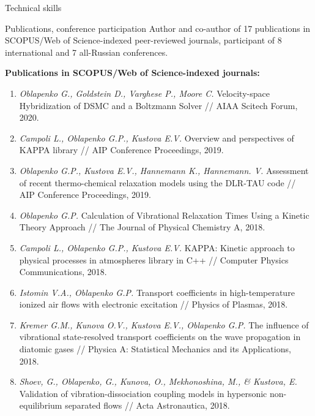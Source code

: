\documentclass{resume} %
\begin{document}
\begin{rSection}{Technical skills}
\pagebreak

\begin{rSection}{Publications, conference participation}
Author and co-author of 17 publications in SCOPUS/Web of Science-indexed peer-reviewed journals, participant of 8 international and 7 all-Russian conferences.

{\bf Publications in SCOPUS/Web of Science-indexed journals:}

\begin{enumerate}

\item \emph{Oblapenko G., Goldstein D., Varghese P., Moore C.} Velocity-space Hybridization of DSMC and a Boltzmann Solver // AIAA Scitech Forum, 2020.

\item \emph{Campoli L., Oblapenko G.P., Kustova E.V.} Overview and perspectives of KAPPA library // AIP Conference Proceedings, 2019.

\item \emph{Oblapenko G.P., Kustova E.V., Hannemann K., Hannemann. V.} Assessment of recent thermo-chemical relaxation models using the DLR-TAU code // AIP Conference Proceedings, 2019.

\item \emph{Oblapenko G.P.} Calculation of Vibrational Relaxation Times Using a Kinetic Theory Approach // The Journal of Physical Chemistry A, 2018.

\item \emph{Campoli L., Oblapenko G.P., Kustova E.V.} KAPPA: Kinetic approach to physical processes in atmospheres library in C++ // Computer Physics Communications, 2018.

\item \emph{Istomin V.A., Oblapenko G.P.} Transport coefficients in high-temperature ionized air flows with electronic excitation // Physics of Plasmas, 2018.

\item \emph{Kremer G.M., Kunova O.V., Kustova E.V., Oblapenko G.P.} The influence of vibrational state-resolved transport coefficients on the wave propagation in diatomic gases // Physica A: Statistical Mechanics and its Applications, 2018.

\item \emph{Shoev, G., Oblapenko, G., Kunova, O., Mekhonoshina, M., \& Kustova, E.} Validation of vibration-dissociation coupling models in hypersonic non-equilibrium separated flows // Acta Astronautica, 2018.


\end{enumerate}
\end{rSection}
\end{rSection}
\end{document}
